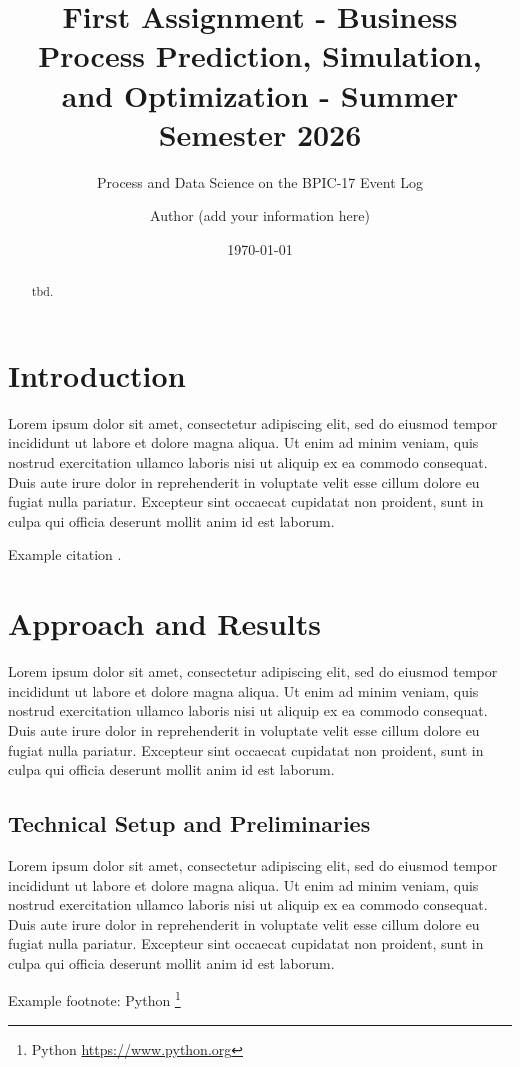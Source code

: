 \documentclass[
  english,        %
  font=times,     %
  twocolumn,      %
]{tumarticle}
\title{First Assignment - Business Process Prediction, Simulation, and Optimization - Summer Semester 2026}
\subtitle{Process and Data Science on the BPIC-17 Event Log}
\author[email=author@tum.de]{Author (add your information here)}
\date\today
\begin{document}
\maketitle

\begin{abstract}
tbd.
\end{abstract}
%

\section{Introduction}
Lorem ipsum dolor sit amet, consectetur adipiscing elit, sed do eiusmod tempor 
incididunt ut labore et dolore magna aliqua. Ut enim ad minim veniam, quis 
nostrud exercitation ullamco laboris nisi ut aliquip ex ea commodo consequat. 
Duis aute irure dolor in reprehenderit in voluptate velit esse cillum dolore 
eu fugiat nulla pariatur. Excepteur sint occaecat cupidatat non proident, sunt 
in culpa qui officia deserunt mollit anim id est laborum.

Example citation \cite{doe2020example}.

\section{Approach and Results}
Lorem ipsum dolor sit amet, consectetur adipiscing elit, sed do eiusmod tempor 
incididunt ut labore et dolore magna aliqua. Ut enim ad minim veniam, quis 
nostrud exercitation ullamco laboris nisi ut aliquip ex ea commodo consequat. 
Duis aute irure dolor in reprehenderit in voluptate velit esse cillum dolore 
eu fugiat nulla pariatur. Excepteur sint occaecat cupidatat non proident, sunt 
in culpa qui officia deserunt mollit anim id est laborum.

\subsection{Technical Setup and Preliminaries}
Lorem ipsum dolor sit amet, consectetur adipiscing elit, sed do eiusmod tempor 
incididunt ut labore et dolore magna aliqua. Ut enim ad minim veniam, quis 
nostrud exercitation ullamco laboris nisi ut aliquip ex ea commodo consequat. 
Duis aute irure dolor in reprehenderit in voluptate velit esse cillum dolore 
eu fugiat nulla pariatur. Excepteur sint occaecat cupidatat non proident, sunt 
in culpa qui officia deserunt mollit anim id est laborum.

Example footnote: 
Python \footnote{\tiny Python \url{https://www.python.org}}
\end{document}
